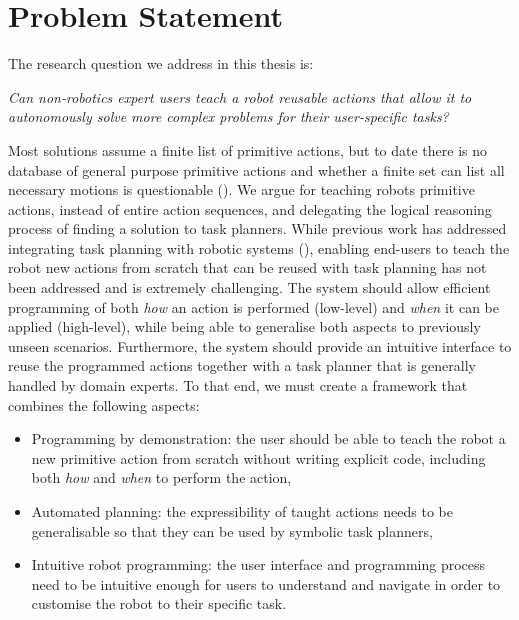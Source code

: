 
\section{Problem Statement}
The research question we address in this thesis is:
\begin{center}
	\textit{Can non-robotics expert users teach a robot reusable actions that allow it to autonomously solve more complex problems for their user-specific tasks?}
\end{center}

Most solutions assume a finite list of primitive actions, but to date there is no database of general purpose primitive actions and whether a finite set can list all necessary motions is questionable (\cite{billard2016learning}).
We argue for teaching robots primitive actions, instead of entire action sequences, and delegating the logical reasoning process of finding a solution to task planners.
While previous work has addressed integrating task planning with robotic systems (\citet{abdo2013learning,cashmore2015rosplan}), enabling end-users to teach the robot new actions from scratch that can be reused with task planning has not been addressed and is extremely challenging. 
The system should allow efficient programming of both \textit{how} an action is performed (low-level) and \textit{when} it can be applied (high-level), while being able to generalise both aspects to previously unseen scenarios. 
Furthermore, the system should provide an intuitive interface to reuse the programmed actions together with a task planner that is generally handled by domain experts.
To that end, we must create a framework that combines the following aspects:
\begin{itemize}
	\item Programming by demonstration: the user should be able to teach the robot a new primitive action from scratch without writing explicit code, including both \textit{how} and \textit{when} to perform the action,
	\item Automated planning: the expressibility of taught actions needs to be generalisable so that they can be used by symbolic task planners,
	\item Intuitive robot programming: the user interface and programming process need to be intuitive enough for users to understand and navigate in order to customise the robot to their specific task.
\end{itemize}

